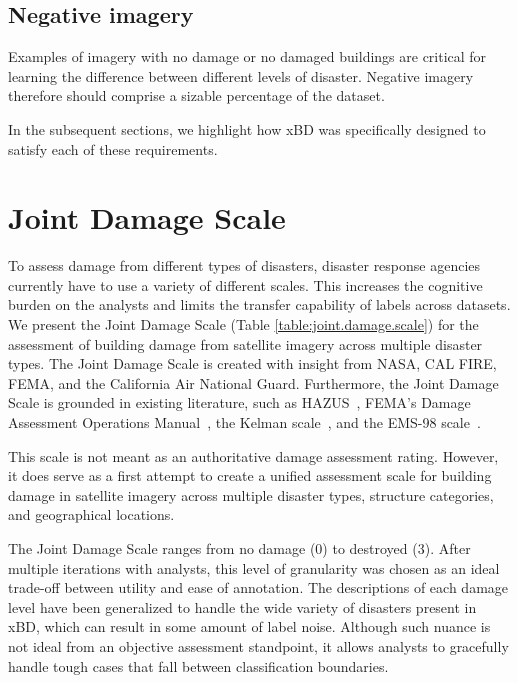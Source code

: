 \documentclass[10pt,twocolumn,letterpaper]{article}
\begin{document}
\subsection{Negative imagery}
Examples of imagery with no damage or no damaged buildings are critical for learning the difference between different levels of disaster. 
Negative imagery therefore should comprise a sizable percentage of the dataset.

In the subsequent sections, we highlight how xBD was specifically designed to satisfy each of these requirements.

\section{Joint Damage Scale}
To assess damage from different types of disasters, disaster response agencies currently have to use a variety of different scales.
This increases the cognitive burden on the analysts and limits the transfer capability of labels across datasets.
We present the Joint Damage Scale (Table \ref{table:joint.damage.scale}) for the assessment of building damage from satellite imagery across multiple disaster types.
The Joint Damage Scale is created with insight from NASA, CAL FIRE, FEMA, and the California Air National Guard.
Furthermore, the Joint Damage Scale is grounded in existing literature, such as HAZUS~\cite{federalemergencymanagementagencyHazusHurricaneModel2018}, FEMA's Damage Assessment Operations Manual~\cite{federalemergencymanagementagencyDamageAssessmentOperations2016}, the Kelman scale~\cite{kelmanPhysicalFloodVulnerability2002}, and the EMS-98 scale~\cite{grunthalEMS98EuropeanMacroseismic1998}.

This scale is not meant as an authoritative damage assessment rating. However, it does serve as a first attempt to create a unified assessment scale for building damage in satellite imagery across multiple disaster types, structure categories, and geographical locations.

The Joint Damage Scale ranges from no damage (0) to destroyed (3).
After multiple iterations with analysts, this level of granularity was chosen as an ideal trade-off between utility and ease of annotation.
The descriptions of each damage level have been generalized to handle the wide variety of disasters present in xBD, which can result in some amount of label noise.
Although such nuance is not ideal from an objective assessment standpoint, it allows analysts to gracefully handle tough cases that fall between classification boundaries.
\end{document}
